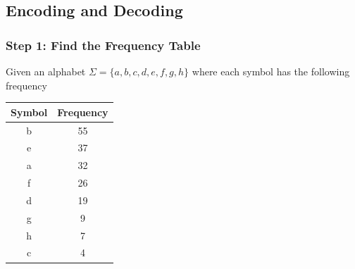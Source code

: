 \documentclass{beamer}
\begin{document}
\subsection{Encoding and Decoding}
\begin{frame}
    \frametitle{Step 1: Find the Frequency Table}
    Given an alphabet $\Sigma =\{a, b, c, d, e, f, g, h\}$ where each symbol has the following frequency\\
    \begin{center}
        \begin{tabular}{ |c|c| } 
            \hline
            Symbol & Frequency \\ 
            \hline
            b & 55 \\
            e & 37 \\
            a & 32 \\ 
            f & 26 \\
            d & 19 \\
            g & 9 \\
            h & 7 \\ 
            c & 4 \\ 
            \hline
        \end{tabular}    
    \end{center}
\end{frame}
\end{document}
